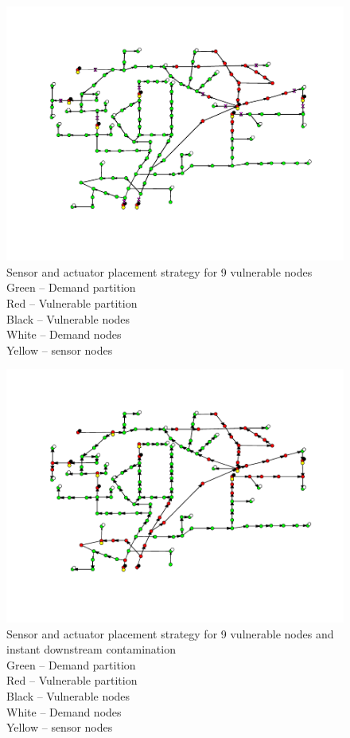 \documentclass[authoryear,preprint,review,12pt]{elsarticle}
\begin{document}
\begin{figure}[h]
\includegraphics[width=\linewidth]{images/zoneContainment_9sources}\caption{Sensor and actuator placement strategy for 9 vulnerable nodes\protect \\
Green -- Demand partition\protect \\
Red -- Vulnerable partition\protect \\
Black -- Vulnerable nodes\protect \\
White -- Demand nodes\protect \\
Yellow -- sensor nodes}
\end{figure}
\begin{figure}[h]
\includegraphics[width=\linewidth]{images/containment_9sources_1downstreamSourceEach}\caption{Sensor and actuator placement strategy for 9 vulnerable nodes and
instant downstream contamination\protect \\
Green -- Demand partition\protect \\
Red -- Vulnerable partition\protect \\
Black -- Vulnerable nodes\protect \\
White -- Demand nodes\protect \\
Yellow -- sensor nodes}
\end{figure}
\end{document}
